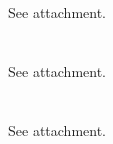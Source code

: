 \documentclass[11pt]{article}
\newcommand{\exercise}{\section{}}
\begin{document}
		

\exercise
See attachment.
\exercise
See attachment.
\exercise
See attachment.
 

\end{document}

